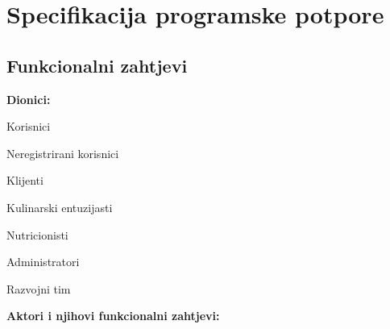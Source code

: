\chapter{Specifikacija programske potpore}
		
	\section{Funkcionalni zahtjevi}
			
			
				
			
			
			\noindent \textbf{Dionici:}
			
			\begin{packed_enum}
				
				\item Korisnici
				\item[]\begin{packed_enum}
					\item Neregistrirani korisnici
					\item Klijenti
					\item Kulinarski entuzijasti
					\item Nutricionisti
				\end{packed_enum}
				\item Administratori
				\item Razvojni tim
				
			\end{packed_enum}
			
			\noindent \textbf{Aktori i njihovi funkcionalni zahtjevi:}
			
